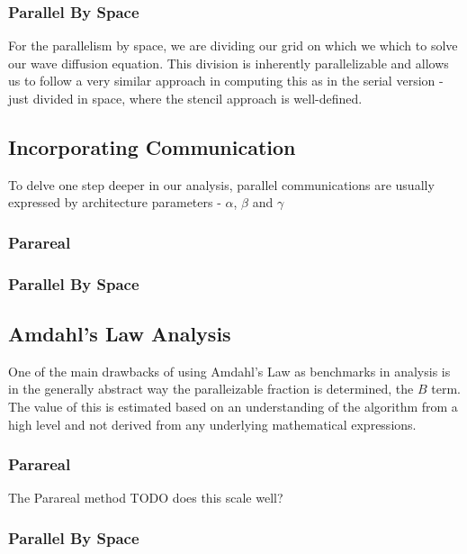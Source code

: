 \documentclass[letterpaper,12pt]{article}
\begin{document}
\subsubsection{Parallel By Space}

For the parallelism by space, we are dividing our grid on which we which to solve our wave diffusion equation. This division is inherently parallelizable and allows us to follow a very similar approach in computing this as in the serial version - just divided in space, where the stencil approach is well-defined. 

\subsection{Incorporating Communication}

To delve one step deeper in our analysis, parallel communications are usually expressed by architecture parameters - $\alpha$, $\beta$ and $\gamma$

\subsubsection{Parareal}

\subsubsection{Parallel By Space}

\subsection{Amdahl's Law Analysis}

One of the main drawbacks of using Amdahl's Law as benchmarks in analysis is in the generally abstract way the paralleizable fraction is determined, the $B$ term.  The value of this is estimated based on an understanding of the algorithm from a high level and not derived from any underlying mathematical expressions.

\subsubsection{Parareal}

The Parareal method TODO does this scale well?

\subsubsection{Parallel By Space}
\end{document}
